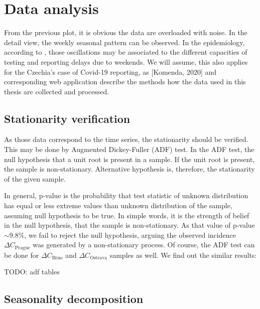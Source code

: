 \documentclass[
  digital, %
  table,   %
  twoside, %
  12pt,
  lof,     %
  lot,     %
]{fithesis3}
\begin{document}
\section{Data analysis}

From the previous plot, it is obvious the data are overloaded 
with noise. 
In the detail view, the weekly seasonal pattern can be observed. 
In the epidemiology, according to \cite{liu2021} \cite{annunziato2020}, 
those oscillations may be associated to the different capacities 
of testing and reporting delays due to weekends. 
We will assume, this also applies for the Czechia's case of 
Covid-19 reporting, as [Komenda, 2020] and corresponding web 
application describe the methods how the data used in this 
thesis are collected and processed.

\subsection{Stationarity verification}

As those data correspond to the time series, the stationarity 
should be verified. 
This may be done by Augmented Dickey-Fuller (ADF) test. 
In the  ADF test, the null hypothesis that a unit root is 
present in a sample. 
If the unit root is present, the sample is non-stationary. 
Alternative hypothesis is, therefore, the stationarity of 
the given sample.

% 




In general, p-value is the probability that test statistic 
of unknown distribution has equal or less extreme values 
than unknown distribution of the sample, assuming null 
hypothesis to be true. In simple words, it is the strength 
of belief in the null hypothesis, that the sample is 
non-stationary. 
As that value of p-value $\sim 9.8 \%$, we fail to reject 
the null hypothesis, arguing the observed incidence 
$\Delta C_{\text{Prague}}$ was generated by a non-stationary 
process. 
Of course, the ADF test can be done for $\Delta C_{\text{Brno}}$ 
and $\Delta C_{\text{Ostrava}}$ samples as well. 
We find out the similar results:

TODO: adf tables

\subsection{Seasonality decomposition}
\end{document}
